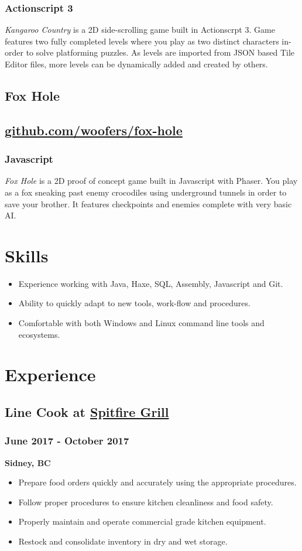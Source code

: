\documentclass[letterpaper]{article}
\begin{document}
\subsubsection{Actionscript 3}
\label{sec-1-6-1}
\emph{Kangaroo Country} is a 2D side-scrolling game built in Actionscrpt 3. Game features two fully completed levels where you play as two distinct characters in-order to solve platforming puzzles. As levels are imported from JSON based Tile Editor files, more levels can be dynamically added and created by others.
\subsection{Fox Hole}
\label{sec-1-7}
\label{sec-1-8}
\subsection{\href{https://github.com/woofers/fox-hole}{github.com/woofers/fox-hole}}
\subsubsection{Javascript}
\label{sec-1-8-1}
\emph{Fox Hole} is a 2D proof of concept game built in Javascript with Phaser. You play as a fox sneaking past enemy crocodiles using underground tunnels in order to save your brother. It features checkpoints and enemies complete with very basic AI.
\section{Skills}
\label{sec-2}
\begin{itemize}
\item Experience working with Java, Haxe, SQL, Assembly, Javascript and Git.
\item Ability to quickly adapt to new tools, work-flow and procedures.
\item Comfortable with both Windows and Linux command line tools and ecosystems.
\end{itemize}
\section{Experience}
\label{sec-3}
\subsection{Line Cook at \href{https://www.spitfiregrill.ca/}{Spitfire Grill}}
\label{sec-3-1}
\subsubsection{June 2017 - October 2017}
\label{sec-3-1-1}
\textbf{Sidney, BC}
\begin{itemize}
\item Prepare food orders quickly and accurately using the appropriate procedures.
\item Follow proper procedures to ensure kitchen cleanliness and food safety.
\item Properly maintain and operate commercial grade kitchen equipment.
\item Restock and consolidate inventory in dry and wet storage.
\end{itemize}
\end{document}
